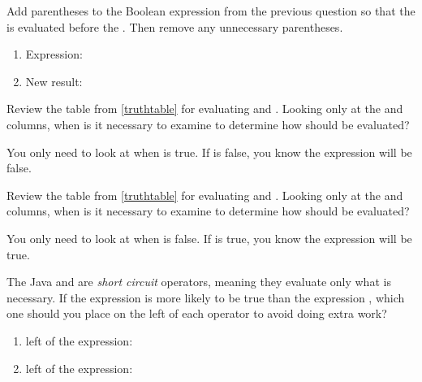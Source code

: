 \Q Add parentheses to the Boolean expression from the previous question so that the \java{&&} is evaluated before the \java{!}. Then remove any unnecessary parentheses.

\begin{enumerate}
\item Expression: 
\item New result: 
\end{enumerate}


\Q Review the table from \ref{truthtable} for evaluating \java{&&} and \java{||}.
Looking only at the  and \java{&&} columns, when is it necessary to examine  to determine how  should be evaluated?

\begin{answer}
You only need to look at  when  is true.
If  is false, you know the expression will be false.
\end{answer}


\Q Review the table from \ref{truthtable} for evaluating \java{&&} and \java{||}.
Looking only at the  and \java{||} columns, when is it necessary to examine  to determine how  should be evaluated?

\begin{answer}
You only need to look at  when  is false.
If  is true, you know the expression will be true.
\end{answer}


\Q The Java \java{&&} and \java{||} are \emph{short circuit} operators, meaning they evaluate only what is necessary.
If the expression  is more likely to be true than the expression , which one should you place on the left of each operator to avoid doing extra work?

\begin{enumerate}
\item left of the \java{&&} expression: 
\item left of the \java{||} expression: 
\end{enumerate}

